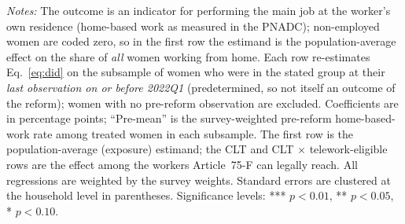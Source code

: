 \begin{table}[H]\centering
\caption{Home-Based Work by Predetermined Subsample: Population-Average versus Legally-Covered Estimands}
\label{tab:estimands}\small
{}
\par\vspace{3pt}\footnotesize\raggedright \textit{Notes:} The outcome is an indicator for performing the main job at the worker's own residence (home-based work as measured in the PNADC); non-employed women are coded zero, so in the first row the estimand is the population-average effect on the share of \emph{all} women working from home. Each row re-estimates Eq.~\eqref{eq:did} on the subsample of women who were in the stated group at their \emph{last observation on or before 2022Q1} (predetermined, so not itself an outcome of the reform); women with no pre-reform observation are excluded. Coefficients are in percentage points; ``Pre-mean'' is the survey-weighted pre-reform home-based-work rate among treated women in each subsample. The first row is the population-average (exposure) estimand; the CLT and CLT $\times$ telework-eligible rows are the effect among the workers Article~75-F can legally reach. All regressions are weighted by the survey weights. Standard errors are clustered at the household level in parentheses. Significance levels: *** $p<0.01$, ** $p<0.05$, * $p<0.10$.
\end{table}
